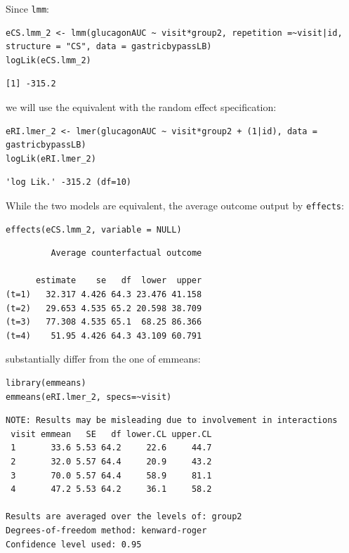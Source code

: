 \documentclass[12pt]{article}
\begin{document}
Since \texttt{lmm}:
\lstset{language=r,label= ,caption= ,captionpos=b,numbers=none}
\begin{lstlisting}
eCS.lmm_2 <- lmm(glucagonAUC ~ visit*group2, repetition =~visit|id, structure = "CS", data = gastricbypassLB)
logLik(eCS.lmm_2)
\end{lstlisting}

\begin{verbatim}
[1] -315.2
\end{verbatim}


we will use the equivalent with the random effect specification:

\lstset{language=r,label= ,caption= ,captionpos=b,numbers=none}
\begin{lstlisting}
eRI.lmer_2 <- lmer(glucagonAUC ~ visit*group2 + (1|id), data = gastricbypassLB)
logLik(eRI.lmer_2)
\end{lstlisting}

\begin{verbatim}
'log Lik.' -315.2 (df=10)
\end{verbatim}


While the two models are equivalent, the average outcome output by
\texttt{effects}:
\lstset{language=r,label= ,caption= ,captionpos=b,numbers=none}
\begin{lstlisting}
effects(eCS.lmm_2, variable = NULL)
\end{lstlisting}

\begin{verbatim}
	     Average counterfactual outcome

      estimate    se   df  lower  upper
(t=1)   32.317 4.426 64.3 23.476 41.158
(t=2)   29.653 4.535 65.2 20.598 38.709
(t=3)   77.308 4.535 65.1  68.25 86.366
(t=4)    51.95 4.426 64.3 43.109 60.791
\end{verbatim}


substantially differ from the one of emmeans:
\lstset{language=r,label= ,caption= ,captionpos=b,numbers=none}
\begin{lstlisting}
library(emmeans)
emmeans(eRI.lmer_2, specs=~visit)
\end{lstlisting}

\begin{verbatim}
NOTE: Results may be misleading due to involvement in interactions
 visit emmean   SE   df lower.CL upper.CL
 1       33.6 5.53 64.2     22.6     44.7
 2       32.0 5.57 64.4     20.9     43.2
 3       70.0 5.57 64.4     58.9     81.1
 4       47.2 5.53 64.2     36.1     58.2

Results are averaged over the levels of: group2 
Degrees-of-freedom method: kenward-roger 
Confidence level used: 0.95
\end{verbatim}
\end{document}
